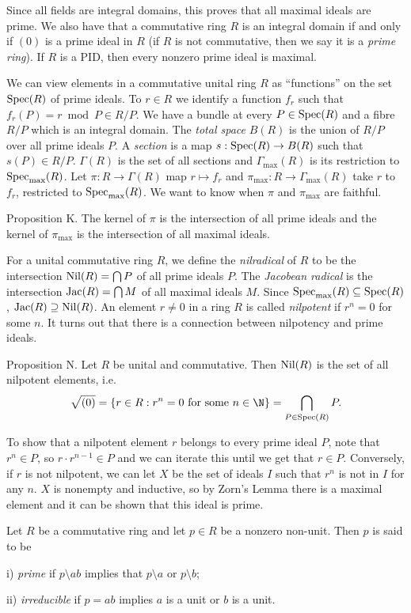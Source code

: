 Since all fields are integral domains, this proves that all maximal ideals are prime. We also have that a commutative ring $R$ is an integral domain if and only if $(0)$ is a prime ideal in $R$ (if $R$ is not commutative, then we say it is a {\it prime ring}). If $R$ is a PID, then every nonzero prime ideal is maximal.

We can view elements in a commutative unital ring $R$ as ``functions'' on the set $\mathop {\rm Spec}(R)$ of prime ideals. To $r\in R$ we identify a function $f_r$ such that $f_r(P) = r \bmod P\in R/P$. We have a bundle at every $P\in \mathop {\rm Spec}(R)$ and a fibre $R/P$ which is an integral domain. The {\it total space} $B(R)$ is the union of $R/P$ over all prime ideals $P$. A {\it section} is a map $s: \mathop {\rm Spec}(R)\to B(R)$ such that $s(P)\in R/P$. $\Gamma(R)$ is the set of all sections and $\Gamma_{\max}(R)$ is its restriction to $\mathop {\rm Spec}_{\max}(R)$. Let $\pi : R\to \Gamma(R)$ map $r\mapsto f_r$ and $\pi_{\max} : R\to \Gamma_{\max}(R)$ take $r$ to $f_r$, restricted to $\mathop {\rm Spec}_{\max}(R)$. We want to know when $\pi$ and $\pi_{\max}$ are faithful.

\proclaim Proposition K. The kernel of $\pi$ is the intersection of all prime ideals and the kernel of $\pi_{\max}$ is the intersection of all maximal ideals.\slug

For a unital commutative ring $R$, we define the {\it nilradical} of $R$ to be the intersection $\mathop {\rm Nil}(R) = \bigcap P$ of all prime ideals $P$. The {\it Jacobean radical} is the intersection $\mathop {\rm Jac}(R) = \bigcap M$ of all maximal ideals $M$. Since $\mathop {\rm Spec}_{\max}(R) \subseteq \mathop {\rm Spec}(R)$, $\mathop {\rm Jac}(R) \supseteq \mathop {\rm Nil}(R)$. An element $r\neq 0$ in a ring $R$ is called {\it nilpotent} if $r^n = 0$ for some $n$. It turns out that there is a connection between nilpotency and prime ideals.

\proclaim Proposition N. Let $R$ be unital and commutative. Then $\mathop {\rm Nil}(R)$ is the set of all nilpotent elements, i.e.
$$\sqrt{(0)} = \{r\in R : r^n = 0\ \hbox{for some}\ n\in \N\} = \bigcap_{P\in \Spec(R)} P.$$

\proof To show that a nilpotent element $r$ belongs to every prime ideal $P$, note that $r^n \in P$, so $r\cdot r^{n-1}\in P$ and we can iterate this until we get that $r\in P$. Conversely, if $r$ is not nilpotent, we can let $X$ be the set of ideals $I$ such that $r^n$ is not in $I$ for any $n$. $X$ is nonempty and inductive, so by Zorn's Lemma there is a maximal element and it can be shown that this ideal is prime.\slug

Let $R$ be a commutative ring and let $p\in R$ be a nonzero non-unit. Then $p$ is said to be
\medskip
\item{i)} {\it prime} if $p\setminus ab$ implies that $p\setminus a$ or $p\setminus b$;
\smallskip
\item{ii)} {\it irreducible} if $p=ab$ implies $a$ is a unit or $b$ is a unit.
\medskip

